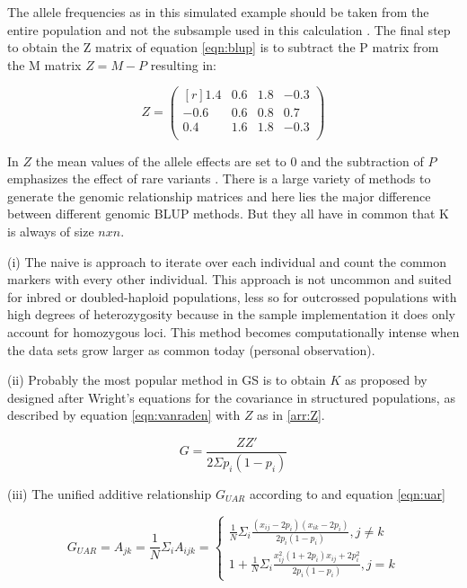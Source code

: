 The allele frequencies as in this simulated example should be taken from the entire population and not the
subsample used in this calculation \cite{vanraden2008efficient}. The final step to obtain the Z matrix of
equation \ref{eqn:blup} is to subtract the P matrix from the M matrix $Z= M - P$ resulting in:

\begin{equation}
 Z = 
 \begin{pmatrix}[r]
  1.4 & 0.6 & 1.8 & -0.3 \\
  -0.6 & 0.6 & 0.8 & 0.7 \\
  0.4 & 1.6 & 1.8 & -0.3 \\

 \end{pmatrix}
 \label{arr:Z}
\end{equation}

In $Z$ the mean values of the allele effects are set to 0 and the subtraction of $P$ emphasizes the effect of
rare variants \cite{vanraden2008efficient}. There is a large variety of methods to generate the genomic
relationship matrices and here lies the major difference between different genomic BLUP methods. But they all
have in common that K is always of size $n x n$.

(i) The naive is approach to iterate over each individual and count the common markers with every other
individual. This approach is not uncommon and suited for inbred or doubled-haploid populations, less so for
outcrossed populations with high degrees of heterozygosity because in the sample implementation it does only
account for homozygous loci. This method becomes computationally intense when the data sets grow larger as
common today (personal observation).

(ii) Probably the most popular method in GS is to obtain $K$ as proposed by \cite{vanraden2008efficient} designed after Wright's \cite{wright1922coefficients} equations for the covariance in structured populations, as described by equation \ref{eqn:vanraden} with $Z$ as in \ref{arr:Z}.

\begin{equation}
 G = \frac{ZZ'}{2 \Sigma p_i (1-p_i)} 
\label{eqn:vanraden}
\end{equation}

(iii) The unified additive relationship $G_{UAR}$ according to \cite{yang2010common} and equation \ref{eqn:uar}

\begin{equation}
 G_{UAR} = A_{jk} = \frac{1}{N} \Sigma_i{A_{ijk}} = \left\{
  \!\begin{aligned}
   \frac{1}{N} \Sigma_{i} \frac{(x_{ij} - 2p_i)(x_{ik} - 2p_i)}{2p_i (1-p_i)}, j \ne k \\
   1 + \frac{1}{N} \Sigma_i \frac{x_{ij}^2 (1+2p_i) x_{ij} + 2p_i^2 }{2p_i (1-p_i)}, j = k   
  \end{aligned}
 \right.
 \label{eqn:uar}
\end{equation}

